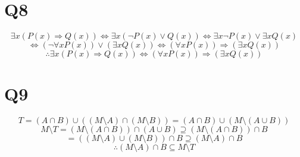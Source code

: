 \documentclass[12pt]{article}
\begin{document}
\section{Q8}
$$\exists x(P(x)\Rightarrow Q(x))\Leftrightarrow\exists x(\neg P(x)\vee Q(x))\Leftrightarrow\exists x\neg P(x)\vee \exists xQ(x)$$
$$\Leftrightarrow(\neg\forall xP(x))\vee(\exists xQ(x))\Leftrightarrow(\forall xP(x))\Rightarrow(\exists xQ(x))$$
$$\therefore \exists x(P(x)\Rightarrow Q(x))\Leftrightarrow(\forall xP(x))\Rightarrow(\exists xQ(x))$$

\section{Q9}
$$T=(A\cap B)\cup((M\setminus A)\cap(M\setminus B))=(A\cap B)\cup(M\setminus(A\cup B))$$
$$M\setminus T=(M\setminus(A\cap B))\cap(A\cup B)\supseteq(M\setminus(A\cap B))\cap B$$
$$= ((M\setminus A)\cup (M\setminus B))\cap B\supseteq (M\setminus A)\cap B$$
$$\therefore (M\setminus A)\cap B\subseteq M\setminus T$$
\end{document}
